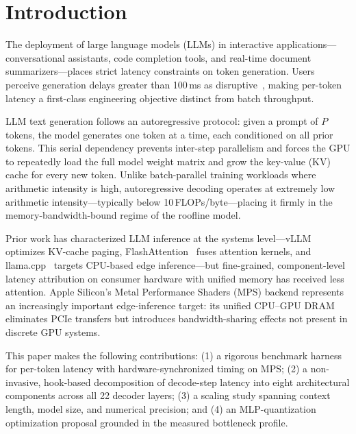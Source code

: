 \documentclass[conference]{IEEEtran}
\begin{document}
\section{Introduction}

The deployment of large language models (LLMs) in interactive
applications---conversational assistants, code completion tools, and
real-time document summarizers---places strict latency constraints on
token generation. Users perceive generation delays greater than 100\,ms
as disruptive~\cite{nielsen1993}, making per-token latency a first-class
engineering objective distinct from batch throughput.

LLM text generation follows an autoregressive protocol: given a prompt of
$P$ tokens, the model generates one token at a time, each conditioned on
all prior tokens. This serial dependency prevents inter-step parallelism
and forces the GPU to repeatedly load the full model weight matrix and
grow the key-value (KV) cache for every new token. Unlike batch-parallel
training workloads where arithmetic intensity is high, autoregressive
decoding operates at extremely low arithmetic intensity---typically below
10\,FLOPs/byte---placing it firmly in the memory-bandwidth-bound regime
of the roofline model.

Prior work has characterized LLM inference at the systems level---vLLM~\cite{kwon2023}
optimizes KV-cache paging, FlashAttention~\cite{dao2022} fuses attention kernels, and
llama.cpp~\cite{gerganov2023} targets CPU-based edge inference---but
fine-grained, component-level latency attribution on consumer hardware
with unified memory has received less attention. Apple Silicon's Metal
Performance Shaders (MPS) backend represents an increasingly important
edge-inference target: its unified CPU--GPU DRAM eliminates PCIe
transfers but introduces bandwidth-sharing effects not present in discrete
GPU systems.

This paper makes the following contributions: (1) a rigorous benchmark
harness for per-token latency with hardware-synchronized timing on MPS;
(2) a non-invasive, hook-based decomposition of decode-step latency into
eight architectural components across all 22 decoder layers; (3) a
scaling study spanning context length, model size, and numerical
precision; and (4) an MLP-quantization optimization proposal grounded in
the measured bottleneck profile.

\end{document}
